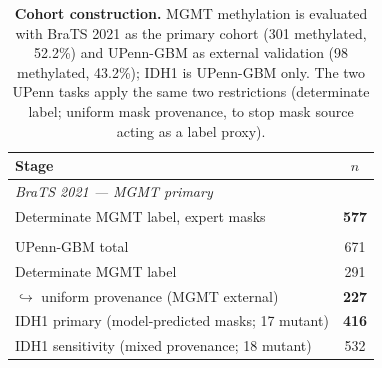 \begin{table}[t]
  \centering
  \caption[Cohort construction]{\textbf{Cohort construction.} MGMT methylation
  is evaluated with BraTS 2021 as the primary cohort (301 methylated, 52.2\%)
  and UPenn-GBM as external validation (98 methylated, 43.2\%); IDH1 is
  UPenn-GBM only. The two UPenn tasks apply the same two restrictions
  (determinate label; uniform mask provenance, to stop mask source acting as a
  label proxy).}
  \label{tab:cohorts}
  \begin{tabular}{lc}
    \toprule
    Stage & $n$ \\
    \midrule
    \multicolumn{2}{l}{\emph{BraTS 2021 — MGMT primary}} \\
    Determinate MGMT label, expert masks             & \textbf{577} \\
    \addlinespace
    \multicolumn{2}{l}{\emph{UPenn-GBM — MGMT external validation, IDH1}} \\
    UPenn-GBM total                                  & 671 \\
    Determinate MGMT label                           & 291 \\
    \quad$\hookrightarrow$ uniform provenance (MGMT external) & \textbf{227} \\
    IDH1 primary (model-predicted masks; 17 mutant)  & \textbf{416} \\
    IDH1 sensitivity (mixed provenance; 18 mutant)   & 532 \\
    \bottomrule
  \end{tabular}
\end{table}

